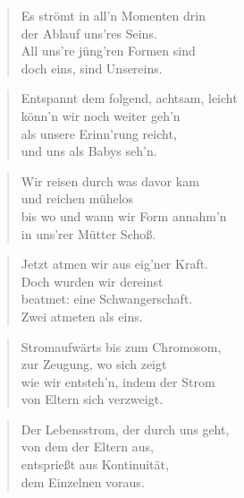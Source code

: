 \documentclass[10pt,a4paper]{article}
\begin{document}
\begin{paracol}{2}
\begin{verse}
Es strömt in all’n Momenten drin \\
der Ablauf uns’res Seins. \\
All uns’re jüng’ren Formen sind \\
doch eins, sind Unsereins. \\
\end{verse}

\begin{verse}
Entspannt dem folgend, achtsam, leicht \\
könn’n wir noch weiter geh’n \\
als unsere Erinn’rung reicht, \\
und uns als Babys seh’n. \\
\end{verse}

\begin{verse}
Wir reisen durch was davor kam \\
und reichen mühelos \\
bis wo und wann wir Form annahm’n \\
in uns’rer Mütter Schoß. \\
\end{verse}

\begin{verse}
Jetzt atmen wir aus eig’ner Kraft. \\
Doch wurden wir dereinst \\
beatmet: eine Schwangerschaft. \\
Zwei atmeten als eins. \\
\end{verse}

\begin{verse}
Stromaufwärts bis zum Chromosom, \\
zur Zeugung, wo sich zeigt \\
wie wir entsteh’n, indem der Strom \\
von Eltern sich verzweigt. \\
\end{verse}

\begin{verse}
Der Lebensstrom, der durch uns geht, \\
von dem der Eltern aus, \\
entsprießt aus Kontinuität, \\
dem Einzelnen voraus. \\
\end{verse}


\end{paracol}
\end{document}
